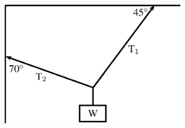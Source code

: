 \begin{enumerate}[noitemsep, label=\textbf{\arabic*}. ]
    \setcounter{subfigure}{0}


	\begin{figure}[H] %
    \begin{center}
    \label{m38819*id198746!!!underscore!!!media}\label{m38819*id198746!!!underscore!!!printimage}\includegraphics[width=300px]{col11305.imgs/m38819_PG11C1_080.png} %
        
      \vspace{2pt}
    \vspace{.1in}
    
    \end{center}

 \end{figure}   


\end{enumerate}
